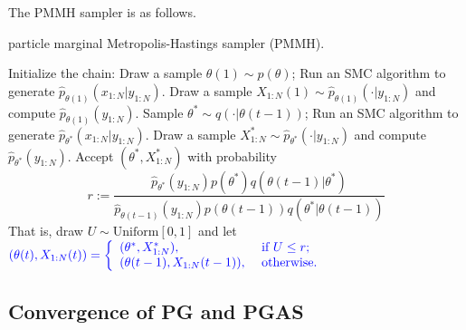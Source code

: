 \documentclass[12pt]{article}
\def\phat{\widehat{p}}
\begin{document}
 The PMMH sampler is as follows. 
 
 \begin{algorithm} %
\caption{particle marginal Metropolis-Hastings sampler (PMMH). } %
\label{alg:pmmh} %
\begin{algorithmic} [1]  %
    \STATE  Initialize the chain: 
     \STATE \hspace{3mm} Draw a sample $\theta(1) \sim p(\theta)$; 
     \STATE \hspace{3mm} Run an SMC algorithm to generate $\phat_{\theta(1)} (x_{1:N}|y_{1:N}) $. Draw a sample $X_{1:N}(1) \sim \phat_{\theta(1)} (\cdot |y_{1:N}) $ and compute $\phat_{\theta(1)}(y_{1:N})$.  
            \STATE Sample $\theta^* \sim  q(\cdot | \theta(t-1))$;  
            \STATE Run an SMC algorithm to generate $\phat_{\theta^*} (x_{1:N}|y_{1:N}) $. Draw a sample $X_{1:N}^* \sim \phat_{\theta^*} (\cdot|y_{1:N}) $ and compute $\phat_{\theta^*}(y_{1:N})$. 
            \STATE Accept $(\theta^*, X_{1:N}^*)$ with probability 
            \[ r := \frac{\phat_{\theta^*}( y_{1:N} ) p(\theta^*) q(\theta(t-1) | \theta^*) }{\phat_{\theta(t-1)} ( y_{1:N} ) p(\theta(t-1)) q(\theta^*|\theta(t-1) ) }
            \]
             That is, draw $U\sim \mathrm{ Uniform[0,1]}$ and let 
              $
                     \textcolor{blue}{(\theta(t), X_{1:N}(t) ) = \left\{ 
                        \begin{array}{ll}
                           (\theta^*, X_{1:N}^*),         & \textrm{ if } U\leq r;  \\
                           (\theta(t-1), X_{1:N}(t-1) ),  & \textrm{ otherwise}.      
                        \end{array} \right.    }
                $
    \ENDFOR
\end{algorithmic}
\end{algorithm}

%
\subsection{Convergence of PG and PGAS}



 
\end{document}
